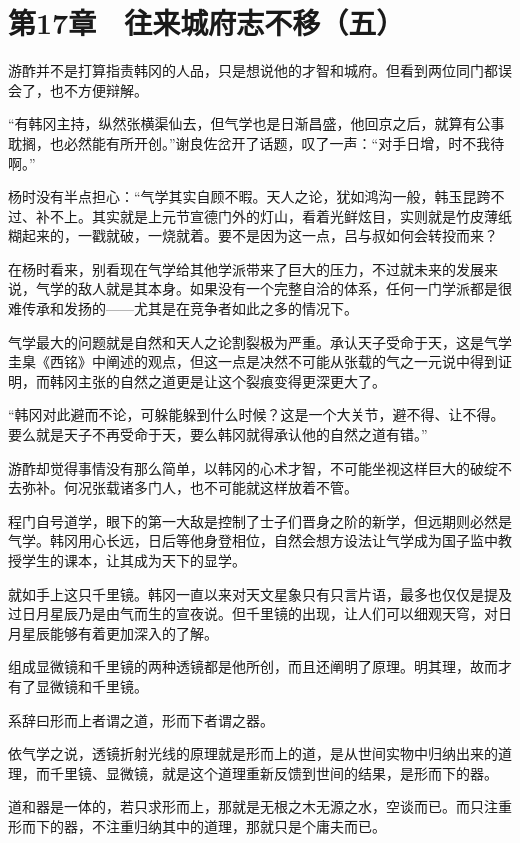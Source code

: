 \section{第17章　往来城府志不移（五）}

游酢并不是打算指责韩冈的人品，只是想说他的才智和城府。但看到两位同门都误会了，也不方便辩解。

“有韩冈主持，纵然张横渠仙去，但气学也是日渐昌盛，他回京之后，就算有公事耽搁，也必然能有所开创。”谢良佐岔开了话题，叹了一声：“对手日增，时不我待啊。”

杨时没有半点担心：“气学其实自顾不暇。天人之论，犹如鸿沟一般，韩玉昆跨不过、补不上。其实就是上元节宣德门外的灯山，看着光鲜炫目，实则就是竹皮薄纸糊起来的，一戳就破，一烧就着。要不是因为这一点，吕与叔如何会转投而来？

在杨时看来，别看现在气学给其他学派带来了巨大的压力，不过就未来的发展来说，气学的敌人就是其本身。如果没有一个完整自洽的体系，任何一门学派都是很难传承和发扬的——尤其是在竞争者如此之多的情况下。

气学最大的问题就是自然和天人之论割裂极为严重。承认天子受命于天，这是气学圭臬《西铭》中阐述的观点，但这一点是决然不可能从张载的气之一元说中得到证明，而韩冈主张的自然之道更是让这个裂痕变得更深更大了。

“韩冈对此避而不论，可躲能躲到什么时候？这是一个大关节，避不得、让不得。要么就是天子不再受命于天，要么韩冈就得承认他的自然之道有错。”

游酢却觉得事情没有那么简单，以韩冈的心术才智，不可能坐视这样巨大的破绽不去弥补。何况张载诸多门人，也不可能就这样放着不管。

程门自号道学，眼下的第一大敌是控制了士子们晋身之阶的新学，但远期则必然是气学。韩冈用心长远，日后等他身登相位，自然会想方设法让气学成为国子监中教授学生的课本，让其成为天下的显学。

就如手上这只千里镜。韩冈一直以来对天文星象只有只言片语，最多也仅仅是提及过日月星辰乃是由气而生的宣夜说。但千里镜的出现，让人们可以细观天穹，对日月星辰能够有着更加深入的了解。

组成显微镜和千里镜的两种透镜都是他所创，而且还阐明了原理。明其理，故而才有了显微镜和千里镜。

系辞曰形而上者谓之道，形而下者谓之器。

依气学之说，透镜折射光线的原理就是形而上的道，是从世间实物中归纳出来的道理，而千里镜、显微镜，就是这个道理重新反馈到世间的结果，是形而下的器。

道和器是一体的，若只求形而上，那就是无根之木无源之水，空谈而已。而只注重形而下的器，不注重归纳其中的道理，那就只是个庸夫而已。

